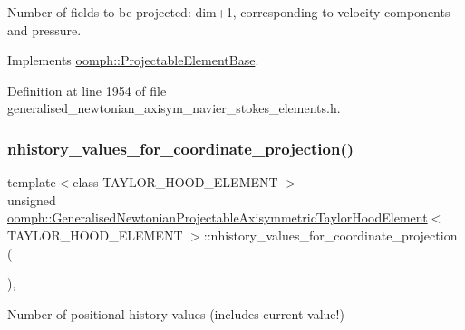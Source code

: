 Number of fields to be projected\+: dim+1, corresponding to velocity components and pressure. 



Implements \hyperlink{classoomph_1_1ProjectableElementBase_a44634aa4049332a580d249c25564638c}{oomph\+::\+Projectable\+Element\+Base}.



Definition at line 1954 of file generalised\+\_\+newtonian\+\_\+axisym\+\_\+navier\+\_\+stokes\+\_\+elements.\+h.

\mbox{\label{classoomph_1_1GeneralisedNewtonianProjectableAxisymmetricTaylorHoodElement_a43822b73b545d33e21a300247e1954b3}} 
\subsubsection{\texorpdfstring{nhistory\+\_\+values\+\_\+for\+\_\+coordinate\+\_\+projection()}{nhistory\_values\_for\_coordinate\_projection()}}
{\footnotesize\ttfamily template$<$class T\+A\+Y\+L\+O\+R\+\_\+\+H\+O\+O\+D\+\_\+\+E\+L\+E\+M\+E\+NT $>$ \\
unsigned \hyperlink{classoomph_1_1GeneralisedNewtonianProjectableAxisymmetricTaylorHoodElement}{oomph\+::\+Generalised\+Newtonian\+Projectable\+Axisymmetric\+Taylor\+Hood\+Element}$<$ T\+A\+Y\+L\+O\+R\+\_\+\+H\+O\+O\+D\+\_\+\+E\+L\+E\+M\+E\+NT $>$\+::nhistory\+\_\+values\+\_\+for\+\_\+coordinate\+\_\+projection (\begin{DoxyParamCaption}{ }\end{DoxyParamCaption})\hspace{0.3cm}{\ttfamily [inline]}, {\ttfamily [virtual]}}



Number of positional history values (includes current value!) 



